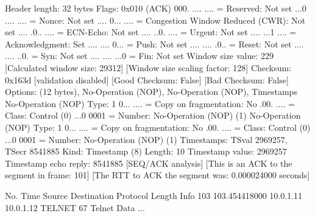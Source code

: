     Header length: 32 bytes
    Flags: 0x010 (ACK)
        000. .... .... = Reserved: Not set
        ...0 .... .... = Nonce: Not set
        .... 0... .... = Congestion Window Reduced (CWR): Not set
        .... .0.. .... = ECN-Echo: Not set
        .... ..0. .... = Urgent: Not set
        .... ...1 .... = Acknowledgment: Set
        .... .... 0... = Push: Not set
        .... .... .0.. = Reset: Not set
        .... .... ..0. = Syn: Not set
        .... .... ...0 = Fin: Not set
    Window size value: 229
    [Calculated window size: 29312]
    [Window size scaling factor: 128]
    Checksum: 0x163d [validation disabled]
        [Good Checksum: False]
        [Bad Checksum: False]
    Options: (12 bytes), No-Operation (NOP), No-Operation (NOP), Timestamps
        No-Operation (NOP)
            Type: 1
                0... .... = Copy on fragmentation: No
                .00. .... = Class: Control (0)
                ...0 0001 = Number: No-Operation (NOP) (1)
        No-Operation (NOP)
            Type: 1
                0... .... = Copy on fragmentation: No
                .00. .... = Class: Control (0)
                ...0 0001 = Number: No-Operation (NOP) (1)
        Timestamps: TSval 2969257, TSecr 8541885
            Kind: Timestamp (8)
            Length: 10
            Timestamp value: 2969257
            Timestamp echo reply: 8541885
    [SEQ/ACK analysis]
        [This is an ACK to the segment in frame: 101]
        [The RTT to ACK the segment was: 0.000024000 seconds]

No.     Time           Source                Destination           Protocol Length Info
    103 103.454418000  10.0.1.11             10.0.1.12             TELNET   67     Telnet Data ...

